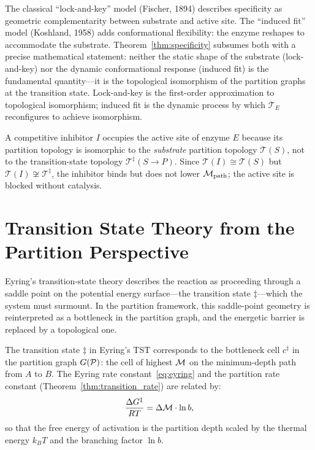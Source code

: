 \begin{remark}
The classical ``lock-and-key'' model (Fischer, 1894) describes specificity as
geometric complementarity between substrate and active site. The ``induced fit''
model (Koshland, 1958) adds conformational flexibility: the enzyme reshapes
to accommodate the substrate. Theorem~\ref{thm:specificity} subsumes both
with a precise mathematical statement: neither the static shape of the substrate
(lock-and-key) nor the dynamic conformational response (induced fit) is the
fundamental quantity---it is the topological isomorphism of the partition
graphs at the transition state. Lock-and-key is the first-order approximation
to topological isomorphism; induced fit is the dynamic process by which
$\mathcal{T}_E$ reconfigures to achieve isomorphism.
\end{remark}

\begin{corollary}
\label{cor:competitive_inhibitor}
A competitive inhibitor $I$ occupies the active site of enzyme $E$ because
its partition topology is isomorphic to the \emph{substrate} partition
topology $\mathcal{T}(S)$, not to the transition-state topology
$\mathcal{T}^\ddagger(S \to P)$. Since $\mathcal{T}(I) \cong \mathcal{T}(S)$
but $\mathcal{T}(I) \not\cong \mathcal{T}^\ddagger$, the inhibitor binds
but does not lower $\mathcal{M}_{\mathrm{path}}$; the active site is blocked
without catalysis.
\end{corollary}

\section{Transition State Theory from the Partition Perspective}
\label{sec:tst_partition}

Eyring's transition-state theory describes the reaction as proceeding through
a saddle point on the potential energy surface---the transition state
$\ddagger$---which the system must surmount. In the partition framework,
this saddle-point geometry is reinterpreted as a bottleneck in the partition
graph, and the energetic barrier is replaced by a topological one.

\begin{proposition}
\label{prop:tst_partition}
The transition state $\ddagger$ in Eyring's TST corresponds to the
bottleneck cell $c^\ddagger$ in the partition graph $G(\mathcal{P})$: the cell
of highest $\mathcal{M}$ on the minimum-depth path from $A$ to $B$. The
Eyring rate constant~\eqref{eq:eyring} and the partition rate constant
(Theorem~\ref{thm:transition_rate}) are related by:
\begin{equation}
  \frac{\Delta G^\ddagger}{RT} = \Delta\mathcal{M} \cdot \ln b,
  \label{eq:tst_partition_relation}
\end{equation}
so that the free energy of activation is the partition depth scaled by
the thermal energy $k_BT$ and the branching factor $\ln b$.
\end{proposition}

